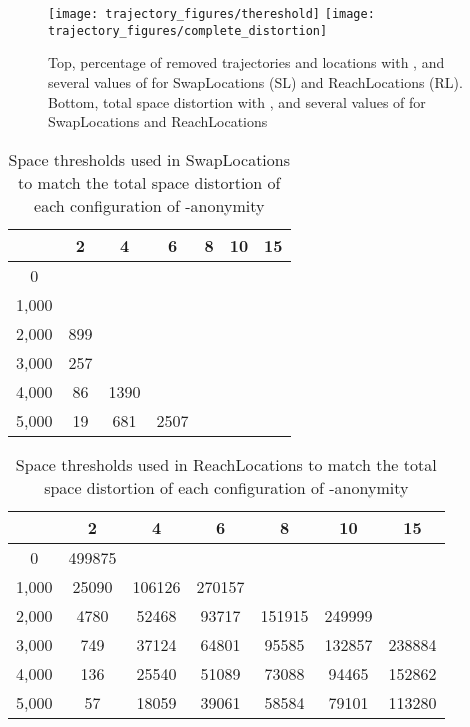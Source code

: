 \begin{figure}[!ht]
\centering
\texttt{[image: trajectory\_figures/thereshold]}
\texttt{[image: trajectory\_figures/complete\_distortion]}
\caption{Top, percentage of removed trajectories and locations
with ,  and several
values of  for SwapLocations (SL) and ReachLocations (RL). Bottom, total
  space distortion with ,  and several
  values of  for SwapLocations and ReachLocations}
  \label{fig:both_method}
\end{figure}

\begin{table}[!ht]
\centering
\begin{tabular}{|c|c|c|c|c|c|c|}
\hline
   & 2 & 4 & 6 & 8 & 10 & 15 \\
\hline
0 &  &  &  &  &  &  \\
1,000 &  &  &  &  &  &  \\
2,000 & 899 &  &  &  &  &  \\
3,000 & 257 &  &  &  &  &  \\
4,000 & 86 & 1390 &  &  &  &  \\
5,000 & 19 & 681 & 2507 &  &  &  \\
\hline
\end{tabular}
\caption{Space thresholds used in SwapLocations to match the total
space distortion of each
configuration of -anonymity}
\label{tab:swap_thresholds}
\end{table}

\begin{table}[!ht]
\centering
\begin{tabular}{|c|c|c|c|c|c|c|}
\hline
   & 2 & 4 & 6 & 8 & 10 & 15 \\
\hline
0 & 499875 &  &  &  &  &  \\
1,000 & 25090 & 106126 & 270157 &  &  &  \\
2,000 & 4780 & 52468 & 93717 & 151915 & 249999 &  \\
3,000 & 749 & 37124 & 64801 & 95585 & 132857 & 238884 \\
4,000 & 136 & 25540 & 51089 & 73088 & 94465 & 152862 \\
5,000 & 57 & 18059 & 39061 & 58584 & 79101 & 113280 \\
\hline
\end{tabular}
\caption{Space thresholds used in ReachLocations to match
the total space distortion of each configuration of -anonymity}
\label{tab:reach_thresholds}
\end{table}

